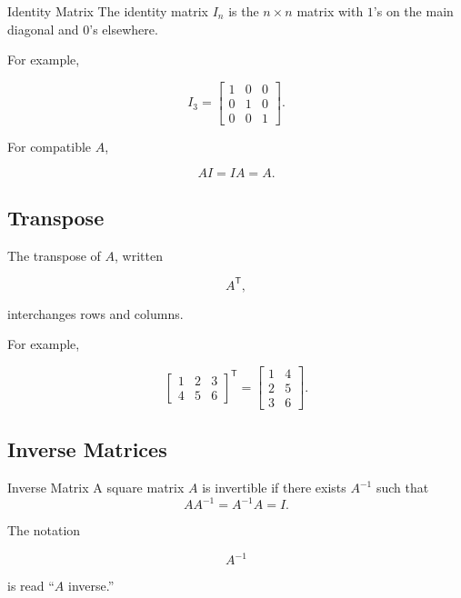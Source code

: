 \begin{definitionbox}{Identity Matrix}
The identity matrix \(I_n\) is the \(n\times n\) matrix with \(1\)'s on the
main diagonal and \(0\)'s elsewhere.
\end{definitionbox}

For example,

\[ I_3=\begin{bmatrix}1&0&0\\0&1&0\\0&0&1\end{bmatrix}. \]

For compatible \(A\),

\[ AI=IA=A. \]

\subsection{Transpose}
\label{subsec:matrix-transpose}

The transpose of \(A\), written

\[ A^{\mathsf T}, \]

interchanges rows and columns.

For example,

\[ \begin{bmatrix}1&2&3\\4&5&6\end{bmatrix}^{\mathsf T}
=
\begin{bmatrix}1&4\\2&5\\3&6\end{bmatrix}. \]

\subsection{Inverse Matrices}
\label{subsec:inverse-matrices}

\begin{definitionbox}{Inverse Matrix}
A square matrix \(A\) is invertible if there exists \(A^{-1}\) such that
\[ AA^{-1}=A^{-1}A=I. \]
\end{definitionbox}

The notation

\[ A^{-1} \]

is read ``\(A\) inverse.''

